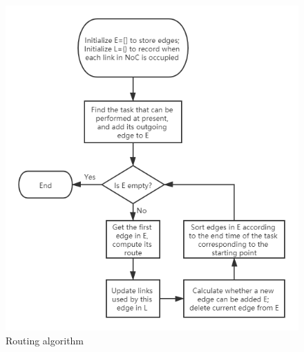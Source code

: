 \begin{figure}
    \centering
    \includegraphics[width=\linewidth]{../Figures/routing.png}
    \caption{Routing algorithm}
\end{figure}